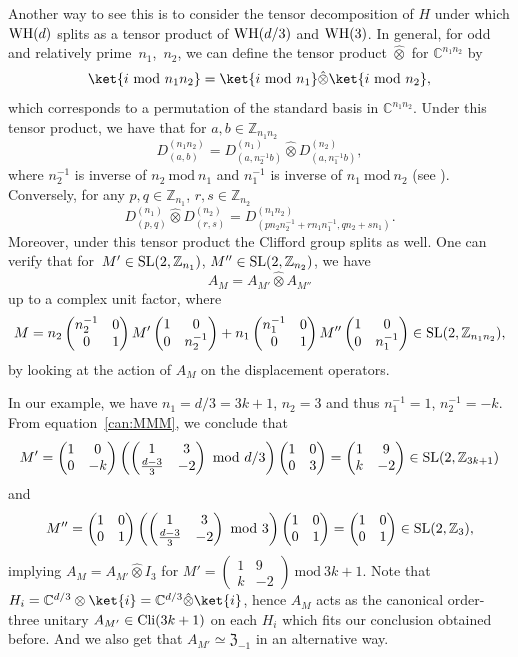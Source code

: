 \documentclass[pdftex]{sigma}
\numberwithin{equation}{section}
\newcommand{\ea}[1]{\begin{align}#1\end{align}}
\newcommand{\mmod}{\mathrm{~mod~}}
\newcommand{\mbb}{\mathbb}
\newcommand{\bmp}{\begin{pmatrix}}
\newcommand{\emp}{\end{pmatrix}}
\begin{document}
Another way to see this is to consider the tensor decomposition of $H$ under which
${\rm WH}(d)$ splits as a tensor product of ${\rm WH}(d/3)$ and ${\rm WH}(3)$.
In general, for odd and relatively prime~$n_1$,~$n_2$, we can define
the tensor product $\hat{\otimes}$ for $\mbb{C}^{n_1n_2}$ by
\[
 \ket{i \mmod n_1n_2} = \ket{i \mmod n_1} \hat{\otimes} \ket{i \mmod n_2},
\]
which corresponds to a permutation of the standard basis in $\mbb{C}^{n_1n_2}$.
Under this tensor product, we have that for $a,b \in \mbb{Z}_{n_1n_2}$
\[
 D_{(a,b)}^{(n_1n_2)} = D_{(a,n_2^{-1}b)}^{(n_1)} \hat{\otimes} D_{(a,n_1^{-1}b)}^{(n_2)},
\]
where $n_2^{-1}$ is inverse of $n_2 \mmod n_1$ and $n_1^{-1}$ is inverse of $n_1 \mmod n_2$ (see \cite{Aligned2d, Aligned}).
Conversely, for any $p,q \in \mbb{Z}_{n_1}$, $r,s \in \mbb{Z}_{n_2}$
\[
 D_{(p,q)}^{(n_1)} \hat{\otimes} D_{(r,s)}^{(n_2)} = D_{(pn_2n_2^{-1}+rn_1n_1^{-1},qn_2+sn_1)}^{(n_1n_2)}.
\]
Moreover, under this tensor product the Clifford group splits as well.
One can verify that for~${M' \in {\rm SL}(2, \mbb{Z}_{n_1})}$, $M'' \in {\rm SL}(2, \mbb{Z}_{n_2})$,
we have
\[
A_M = A_{M'} \hat{\otimes} A_{M''}
\]
up to a complex unit factor, where
\ea{\label{can:MMM}
M = n_2 \bmp n_2^{-1} & 0 \\ 0 & 1\emp M' \bmp 1 & 0 \\ 0 & n_2^{-1}\emp
+ n_1 \bmp n_1^{-1} & 0 \\ 0 & 1\emp M'' \bmp 1 & 0 \\ 0 & n_1^{-1}\emp
\in {\rm SL}(2, \mbb{Z}_{n_1n_2}),
}
by looking at the action of $A_M$ on the displacement operators.

In our example, we have $n_1=d/3=3k+1$, $n_2=3$ and thus $n_1^{-1} = 1$, $n_2^{-1} = -k$.
From equation~\eqref{can:MMM}, we conclude that
\[
 M' = \bmp 1 & 0 \\ 0 & -k\emp \left(\bmp 1 & 3 \\ \frac{d-3}{3} & -2 \emp \mmod d/3 \right) \bmp 1 & 0 \\ 0 & 3 \emp
 = \bmp 1 & 9 \\ k & -2\emp \in {\rm SL}(2, \mbb{Z}_{3k+1})
\]
and
\[
 M'' = \bmp 1 & 0 \\ 0 & 1\emp \left(\bmp 1 & 3 \\ \frac{d-3}{3} & -2 \emp \mmod 3 \right) \bmp 1 & 0 \\ 0 & 1 \emp
 = \bmp 1 & 0 \\ 0 & 1 \emp \in {\rm SL}(2, \mbb{Z}_{3}),
\]
implying $A_M = A_{M'} \hat{\otimes} I_3$ for $M' = \left(\begin{smallmatrix} 1 & 9 \\ k & -2\end{smallmatrix}\right) \mmod 3k+1$.
Note that $H_i = \mbb{C}^{d/3} \otimes \ket{i} = \mbb{C}^{d/3} \hat{\otimes} \ket{i}$, hence
$A_M$ acts as the canonical order-three unitary $A_{M'} \in {\rm Cli}(3k+1)$ on each $H_i$
which fits our conclusion obtained before. And we also get that $A_{M'} \simeq \mathfrak{Z}_{-1}$ in an alternative
way.
\end{document}
